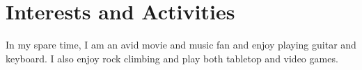 \section{Interests and Activities}
In my spare time, I am an avid movie and music fan and enjoy playing guitar and keyboard. I also enjoy rock climbing and play both tabletop and video games.